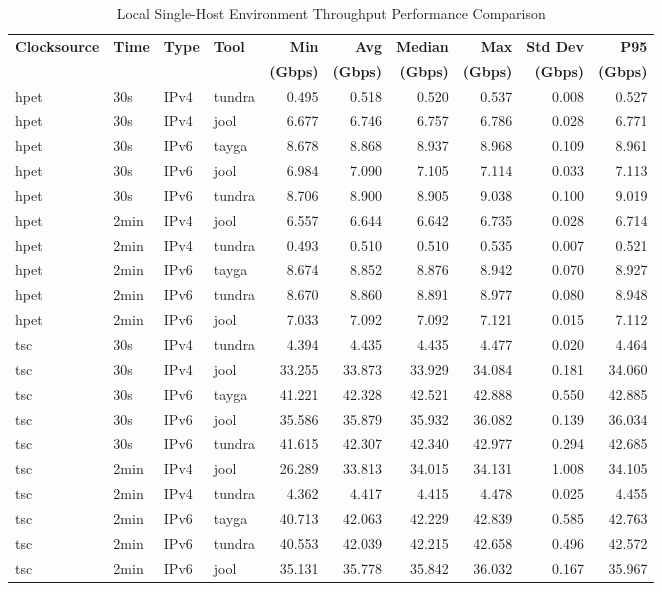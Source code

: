 \begin{table}[htbp]
\centering
\caption{Local Single-Host Environment Throughput Performance Comparison}
\label{tab:throughput_comparison_localsingle}
\footnotesize
\begin{tabular}{|l|l|l|l|r|r|r|r|r|r|}
\hline
\textbf{Clocksource} & \textbf{Time} & \textbf{Type} & \textbf{Tool} & \textbf{Min} & \textbf{Avg} & \textbf{Median} & \textbf{Max} & \textbf{Std Dev} & \textbf{P95} \\
 & & & & \textbf{(Gbps)} & \textbf{(Gbps)} & \textbf{(Gbps)} & \textbf{(Gbps)} & \textbf{(Gbps)} & \textbf{(Gbps)} \\
\hline
hpet & 30s & IPv4 & tundra & 0.495 & 0.518 & 0.520 & 0.537 & 0.008 & 0.527 \\
hpet & 30s & IPv4 & jool & 6.677 & 6.746 & 6.757 & 6.786 & 0.028 & 6.771 \\
hpet & 30s & IPv6 & tayga & 8.678 & 8.868 & 8.937 & 8.968 & 0.109 & 8.961 \\
hpet & 30s & IPv6 & jool & 6.984 & 7.090 & 7.105 & 7.114 & 0.033 & 7.113 \\
hpet & 30s & IPv6 & tundra & 8.706 & 8.900 & 8.905 & 9.038 & 0.100 & 9.019 \\
hpet & 2min & IPv4 & jool & 6.557 & 6.644 & 6.642 & 6.735 & 0.028 & 6.714 \\
hpet & 2min & IPv4 & tundra & 0.493 & 0.510 & 0.510 & 0.535 & 0.007 & 0.521 \\
hpet & 2min & IPv6 & tayga & 8.674 & 8.852 & 8.876 & 8.942 & 0.070 & 8.927 \\
hpet & 2min & IPv6 & tundra & 8.670 & 8.860 & 8.891 & 8.977 & 0.080 & 8.948 \\
hpet & 2min & IPv6 & jool & 7.033 & 7.092 & 7.092 & 7.121 & 0.015 & 7.112 \\
\hline
tsc & 30s & IPv4 & tundra & 4.394 & 4.435 & 4.435 & 4.477 & 0.020 & 4.464 \\
tsc & 30s & IPv4 & jool & 33.255 & 33.873 & 33.929 & 34.084 & 0.181 & 34.060 \\
tsc & 30s & IPv6 & tayga & 41.221 & 42.328 & 42.521 & 42.888 & 0.550 & 42.885 \\
tsc & 30s & IPv6 & jool & 35.586 & 35.879 & 35.932 & 36.082 & 0.139 & 36.034 \\
tsc & 30s & IPv6 & tundra & 41.615 & 42.307 & 42.340 & 42.977 & 0.294 & 42.685 \\
tsc & 2min & IPv4 & jool & 26.289 & 33.813 & 34.015 & 34.131 & 1.008 & 34.105 \\
tsc & 2min & IPv4 & tundra & 4.362 & 4.417 & 4.415 & 4.478 & 0.025 & 4.455 \\
tsc & 2min & IPv6 & tayga & 40.713 & 42.063 & 42.229 & 42.839 & 0.585 & 42.763 \\
tsc & 2min & IPv6 & tundra & 40.553 & 42.039 & 42.215 & 42.658 & 0.496 & 42.572 \\
tsc & 2min & IPv6 & jool & 35.131 & 35.778 & 35.842 & 36.032 & 0.167 & 35.967 \\
\hline
\end{tabular}
\end{table}

